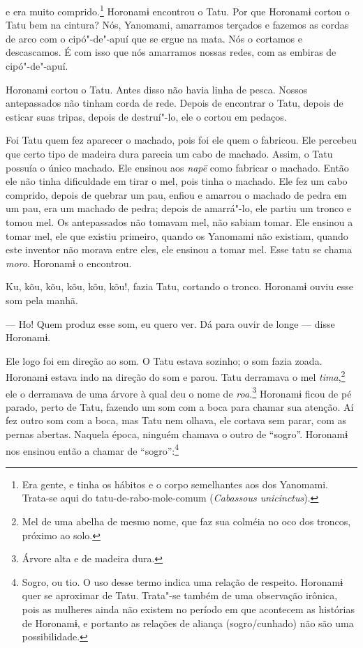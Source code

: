 
 

 

 e era muito comprido.\footnote{  Era gente, e tinha os hábitos e o corpo semelhantes aos dos Yanomami. Trata-se aqui do tatu-de-rabo-mole-comum (\emph{Cabassous unicinctus}).}  Horonamɨ
encontrou o Tatu. 
Por que Horonamɨ cortou o Tatu bem na cintura? Nós, Yanomami, amarramos
terçados e fazemos as cordas de arco com o cipó"-de"-apuí que se ergue na
mata. Nós o cortamos e descascamos. É com isso que nós amarramos nossas
redes, com as embiras de cipó"-de"-apuí. 

Horonamɨ cortou o Tatu. Antes disso não havia linha de pesca. Nossos
antepassados não tinham corda de rede. Depois de encontrar o Tatu,
depois de esticar suas tripas, depois de destruí"-lo, ele o cortou em
pedaços. 

Foi Tatu quem fez aparecer o machado, pois foi ele quem o fabricou. Ele
percebeu que certo tipo de madeira dura parecia um cabo de machado.
Assim, o Tatu possuía o único machado. Ele ensinou aos \emph{napë} como
fabricar o machado. Então ele não tinha dificuldade em tirar o mel, pois
tinha o machado. Ele fez um cabo comprido, depois de quebrar um pau,
enfiou e amarrou o machado de pedra em um pau, era um machado de pedra;
depois de amarrá"-lo, ele partiu um tronco e tomou mel. Os antepassados
não tomavam mel, não sabiam tomar. Ele ensinou a tomar mel, ele que
existiu primeiro, quando os Yanomami não existiam, quando este inventor
não morava entre eles, ele ensinou a tomar mel. Esse tatu se
chama \emph{moro}. Horonamɨ o encontrou. 

Ku, kõu, kõu, kõu, kõu, kõu!, fazia Tatu, cortando o tronco.
Horonamɨ ouviu esse som pela manhã. 

--- Ho! Quem produz esse som, eu quero ver. Dá para ouvir de longe --- disse
Horonamɨ. 

Ele logo foi em direção ao som. O Tatu estava sozinho; o som fazia
zoada. Horonamɨ estava indo na direção do som e parou. Tatu derramava o
mel \emph{tima},\footnote{  Mel de uma abelha de mesmo nome, que faz sua colméia no oco dos troncos, próximo ao solo.} ele o derramava de uma árvore à qual deu o nome
de \emph{roa}\emph{.}\footnote{  Árvore alta e de madeira dura.} Horonamɨ ficou de pé parado, perto de Tatu, fazendo um som com a boca para chamar sua atenção. Aí fez
outro som com a boca, mas Tatu nem olhava, ele cortava sem parar, com as
pernas abertas. Naquela época, ninguém chamava o outro de ``sogro''.
Horonamɨ nos ensinou então a chamar de ``sogro'':\footnote{  Sogro, ou tio. O uso desse termo indica uma relação de respeito. Horonamɨ quer se aproximar de Tatu. Trata"-se também de uma observação irônica, pois as mulheres ainda não existem no período em que acontecem as histórias de Horonamɨ, e portanto as relações de aliança (sogro/cunhado) não são uma possibilidade.}

